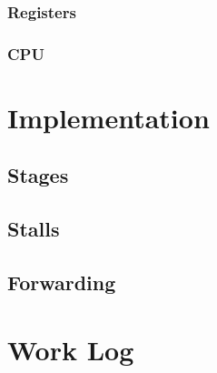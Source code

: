 \documentclass[12pt]{article}
\begin{document}
\subsubsection{Registers}

\subsubsection{CPU}

\section{Implementation}
\subsection{Stages}

\subsection{Stalls}

\subsection{Forwarding}

\section{Work Log}
\blindtext
\end{document}
